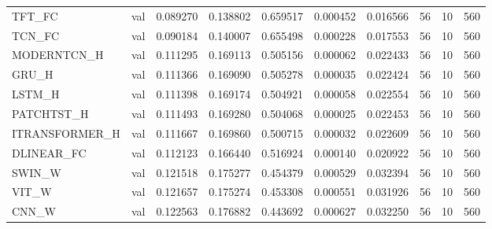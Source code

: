\begin{tabular}{llrrrrrrrr}
TFT\_FC & val & 0.089270 & 0.138802 & 0.659517 & 0.000452 & 0.016566 & 56 & 10 & 560 \\
TCN\_FC & val & 0.090184 & 0.140007 & 0.655498 & 0.000228 & 0.017553 & 56 & 10 & 560 \\
MODERNTCN\_H & val & 0.111295 & 0.169113 & 0.505156 & 0.000062 & 0.022433 & 56 & 10 & 560 \\
GRU\_H & val & 0.111366 & 0.169090 & 0.505278 & 0.000035 & 0.022424 & 56 & 10 & 560 \\
LSTM\_H & val & 0.111398 & 0.169174 & 0.504921 & 0.000058 & 0.022554 & 56 & 10 & 560 \\
PATCHTST\_H & val & 0.111493 & 0.169280 & 0.504068 & 0.000025 & 0.022453 & 56 & 10 & 560 \\
ITRANSFORMER\_H & val & 0.111667 & 0.169860 & 0.500715 & 0.000032 & 0.022609 & 56 & 10 & 560 \\
DLINEAR\_FC & val & 0.112123 & 0.166440 & 0.516924 & 0.000140 & 0.020922 & 56 & 10 & 560 \\
SWIN\_W & val & 0.121518 & 0.175277 & 0.454379 & 0.000529 & 0.032394 & 56 & 10 & 560 \\
VIT\_W & val & 0.121657 & 0.175274 & 0.453308 & 0.000551 & 0.031926 & 56 & 10 & 560 \\
CNN\_W & val & 0.122563 & 0.176882 & 0.443692 & 0.000627 & 0.032250 & 56 & 10 & 560 \\
\bottomrule
\end{tabular}
